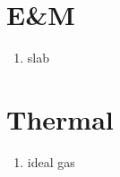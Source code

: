 \documentclass[twocolumn]{article}
\begin{document}
\section{E\&M}
\begin{enumerate}
\item slab
\end{enumerate}

\section{Thermal}
\begin{enumerate}
\item ideal gas
\end{enumerate}
\end{document}
